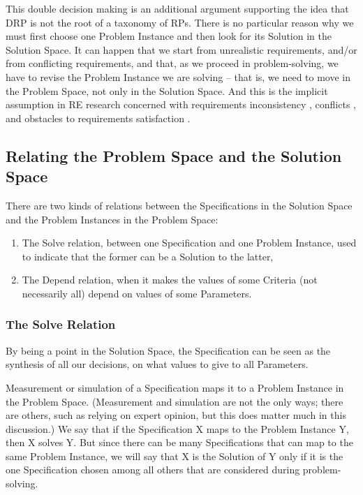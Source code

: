 \documentclass[graybox]{svmult}
\newcommand{\RE}{RE}
\newcommand{\RP}{RP}
\newcommand{\ZJRP}{DRP}
\newcommand{\SolutionSpace}{Solution Space}
\newcommand{\ProblemSpace}{Problem Space}
\newcommand{\Specification}{Specification}
\newcommand{\Solution}{Solution}
\newcommand{\Criteria}{Criteria}
\newcommand{\ProblemInstance}{Problem Instance}
\newcommand{\Parameter}{Parameter}
\newcommand{\Solve}{Solve}
\newcommand{\Depend}{Depend}
\begin{document}
This double decision making is an additional argument supporting the idea that \ZJRP{} is not the root of a taxonomy of \RP s. There is no particular reason why we must first choose one \ProblemInstance{} and then look for its \Solution{} in the \SolutionSpace. It can happen that we start from unrealistic requirements, and/or from conflicting requirements, and that, as we proceed in problem-solving, we have to revise the \ProblemInstance{} we are solving -- that is, we need to move in the \ProblemSpace, not only in the \SolutionSpace. And this is the implicit assumption in \RE{} research concerned with requirements inconsistency \cite{hunter1998managing}, conflicts \cite{van1998managing}, and obstacles to requirements satisfaction \cite{van2000handling}.


%
\subsection{Relating the \ProblemSpace{} and the \SolutionSpace}\label{s:spaces:relationship}
There are two kinds of relations between the \Specification s in the \SolutionSpace{} and the \ProblemInstance s in the \ProblemSpace:
\begin{enumerate}
    \item{The \Solve{} relation, between one \Specification{} and one \ProblemInstance, used to indicate that the former can be a \Solution{} to the latter,}
    \item{The \Depend{} relation, when it makes the values of some \Criteria{} (not necessarily all) depend on values of some \Parameter s.}
\end{enumerate}

%
\subsubsection{The \Solve{} Relation}\label{s:spaces:relationships:solve}
By being a point in the \SolutionSpace, the \Specification{} can be seen as the synthesis of all our decisions, on what values to give to all \Parameter s. 

Measurement or simulation of a \Specification{} maps it to a Problem Instance in the Problem Space. (Measurement and simulation are not the only ways; there are others, such as relying on expert opinion, but this does matter much in this discussion.) We say that if the \Specification{} X maps to the \ProblemInstance{} Y, then X solves Y. But since there can be many \Specification s that can map to the same \ProblemInstance, we will say that X is the \Solution{} of Y only if it is the one \Specification{} chosen among all others that are considered during problem-solving.
\end{document}
